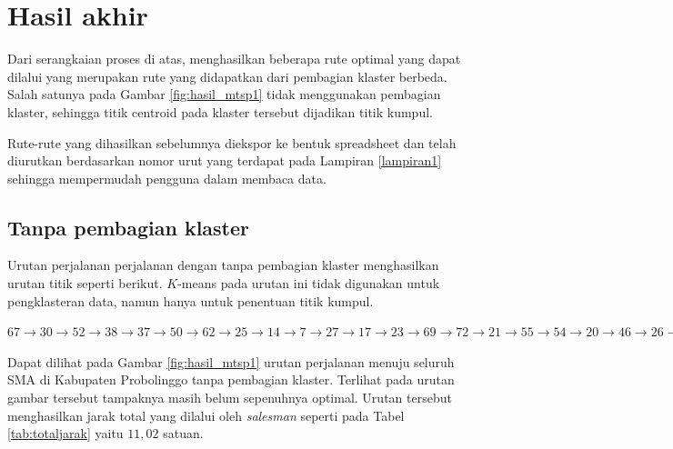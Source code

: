 \section{Hasil akhir}

Dari serangkaian proses di atas, menghasilkan beberapa rute optimal yang dapat dilalui yang merupakan rute yang didapatkan dari pembagian klaster berbeda. Salah satunya pada Gambar \ref{fig:hasil_mtsp1} tidak menggunakan pembagian klaster, sehingga titik centroid pada klaster tersebut dijadikan titik kumpul.

Rute-rute yang dihasilkan sebelumnya diekspor ke bentuk spreadsheet dan telah diurutkan berdasarkan nomor urut yang terdapat pada Lampiran \ref{lampiran1} sehingga mempermudah pengguna dalam membaca data.

\subsection{Tanpa pembagian klaster}

Urutan perjalanan perjalanan dengan tanpa pembagian klaster menghasilkan urutan titik seperti berikut. $K$-means pada urutan ini tidak digunakan untuk pengklasteran data, namun hanya untuk penentuan titik kumpul.

\noindent $
67 \rightarrow 30 \rightarrow 52 \rightarrow 38 \rightarrow 37 \rightarrow 50 \rightarrow 62 \rightarrow 25 \rightarrow 14 \rightarrow 7 \rightarrow 27 \rightarrow 17 \rightarrow 23 \rightarrow 69 \rightarrow 72 \rightarrow 21 \rightarrow 55 \rightarrow 54 \rightarrow 20 \rightarrow 46 \rightarrow 26 \rightarrow 59 \rightarrow 60 \rightarrow 16 \rightarrow 58 \rightarrow 45 \rightarrow 15 \rightarrow 65 \rightarrow 36 \rightarrow 18 \rightarrow 40 \rightarrow 70 \rightarrow 75 \rightarrow 2 \rightarrow 44 \rightarrow 11 \rightarrow 41 \rightarrow 53 \rightarrow 3 \rightarrow 71 \rightarrow 10 \rightarrow 6 \rightarrow 29 \rightarrow 74 \rightarrow 68 \rightarrow 47 \rightarrow 32 \rightarrow 56 \rightarrow 63 \rightarrow 9 \rightarrow 51 \rightarrow 49 \rightarrow 35 \rightarrow 1 \rightarrow 73 \rightarrow 24 \rightarrow 33 \rightarrow 57 \rightarrow 61 \rightarrow 22 \rightarrow 34 \rightarrow 8 \rightarrow 43 \rightarrow 66 \rightarrow 42 \rightarrow 13 \rightarrow 5 \rightarrow 4 \rightarrow 64 \rightarrow 31 \rightarrow 39 \rightarrow 19 \rightarrow 28 \rightarrow 48 \rightarrow 12$

Dapat dilihat pada Gambar \ref{fig:hasil_mtsp1} urutan perjalanan menuju seluruh SMA di Kabupaten Probolinggo tanpa pembagian klaster. Terlihat pada urutan gambar tersebut tampaknya masih belum sepenuhnya optimal. Urutan tersebut menghasilkan jarak total yang dilalui oleh \textit{salesman} seperti pada Tabel \ref{tab:totaljarak} yaitu $11,02$ satuan.

